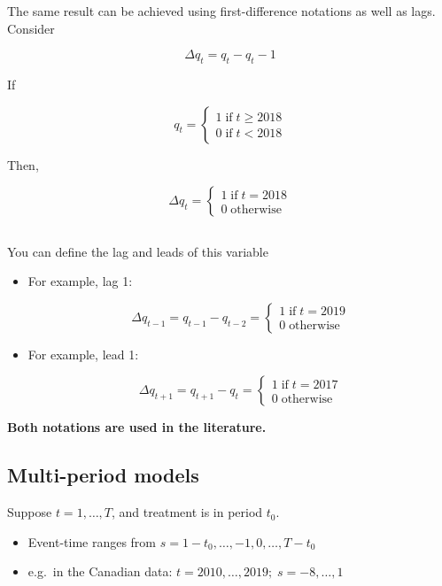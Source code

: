 \documentclass[
  letterpaper,
  DIV=11,
  numbers=noendperiod]{scrartcl}
\begin{document}
The same result can be achieved using first-difference notations as well
as lags. Consider

\[
  \Delta q_t = q_t - q_t-1
\]

If

\[
  q_t = \begin{cases} 
  1\;\text{if}\;t\geq 2018 \\
  0\;\text{if}\;t<2018
  \end{cases}
\]

Then,

\[
  \Delta q_t = \begin{cases} 
  1\;\text{if}\;t= 2018 \\
  0\;\text{otherwise}
  \end{cases}
\]

\subsection{}\label{section-13}

You can define the lag and leads of this variable

\begin{itemize}
\item
  For example, lag 1:

  \[
  \Delta q_{t-1} = q_{t-1} - q_{t-2} = \begin{cases} 
    1\;\text{if}\;t= 2019 \\
    0\;\text{otherwise}
    \end{cases}
  \]
\item
  For example, lead 1:

  \[
  \Delta q_{t+1} = q_{t+1} - q_{t} = \begin{cases} 
    1\;\text{if}\;t= 2017 \\
    0\;\text{otherwise}
    \end{cases}
  \]
\end{itemize}

\textbf{Both notations are used in the literature.}

\subsection{Multi-period models}\label{multi-period-models}

Suppose \(t = 1,\dots,T\), and treatment is in period \(t_0\).

\begin{itemize}
\item
  Event-time ranges from \(s = 1-t_0,\dots,-1,0,\dots,T-t_0\)
\item
  e.g.~in the Canadian data: \(t = 2010,\dots,2019;\;s = -8,\dots,1\)
\end{itemize}
\end{document}
